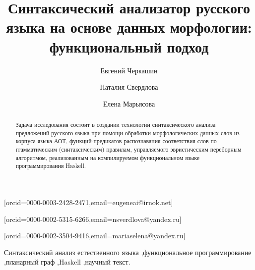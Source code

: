 \documentclass[
]{ceurart}
\begin{document}




\title{Синтаксический анализатор русского языка на основе данных морфологии: функциональный подход}
\author[1,3]{Евгений Черкашин}[orcid=0000-0003-2428-2471,email=eugeneai@irnok.net]
\author[2]{Наталия Свердлова}[orcid=0000-0002-5315-6266,email=nsverdlova@yandex.ru]
\author[2]{Елена Марьясова}[orcid=0000-0002-3504-9416,email=mariaselena@yandex.ru]

\address[1]{Институт динамики систем и теории управления СО РАН, Ул. Лермонтова, д. 134, Иркутск, 664033, Россия}
\address[2]{Иркутский научный центр СО РАН, Ул. Лермонтова, д. 134, Иркутск, 664033, Россия}
\address[3]{Институт математики и информационных технологий Иркутского государственного университета, Бульв. Гадарина, д. 20, Иркутск, 6640003, Россия}

\maketitle

\begin{abstract}
Задача исследования состоит в создании технологии синтаксического
анализа предложений русского языка при помощи обработки морфологических
данных слов из корпуса языка АОТ, функций-предикатов распознавания
соответствия слов по ггамматическим (синтаксическим) правилам,
управляемого эвристическим переборным алгоритмом, реализованным на
компилируемом функциональном языке программирования Haskell.
\end{abstract}

\begin{keywords}
Синтаксический анализ естественного языка \sep функциональное
программирование \sep планарный граф \sep Haskell \sep научный текст.
\end{keywords}
\end{document}
